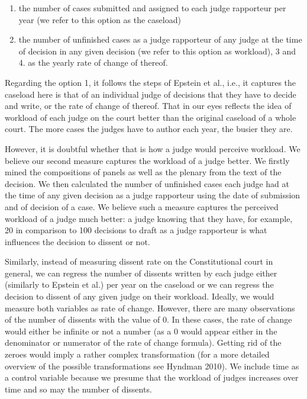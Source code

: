 \documentclass[
  11pt,
]{article}
\providecommand{\tightlist}{%
  \setlength{\itemsep}{0pt}\setlength{\parskip}{0pt}}
\begin{document}
\begin{enumerate}
\def\labelenumi{\arabic{enumi}.}
\tightlist
\item
  the number of cases submitted and assigned to each judge rapporteur
  per year (we refer to this option as the caseload)
\item
  the number of unfinished cases as a judge rapporteur of any judge at
  the time of decision in any given decision (we refer to this option as
  workload), 3 and 4. as the yearly rate of change of thereof.
\end{enumerate}

Regarding the option 1, it follows the steps of Epstein et al., i.e., it
captures the caseload here is that of an individual judge of decisions
that they have to decide and write, or the rate of change of thereof.
That in our eyes reflects the idea of workload of each judge on the
court better than the original caseload of a whole court. The more cases
the judges have to author each year, the busier they are.

However, it is doubtful whether that is how a judge would perceive
workload. We believe our second measure captures the workload of a judge
better. We firstly mined the compositions of panels as well as the
plenary from the text of the decision. We then calculated the number of
unfinished cases each judge had at the time of any given decision as a
judge rapporteur using the date of submission and of decision of a case.
We believe such a measure captures the perceived workload of a judge
much better: a judge knowing that they have, for example, 20 in
comparison to 100 decisions to draft as a judge rapporteur is what
influences the decision to dissent or not.

Similarly, instead of measuring dissent rate on the Constitutional court
in general, we can regress the number of dissents written by each judge
either (similarly to Epstein et al.) per year on the caseload or we can
regress the decision to dissent of any given judge on their workload.
Ideally, we would measure both variables as rate of change. However,
there are many observations of the number of dissents with the value of
0. In these cases, the rate of change would either be infinite or not a
number (as a 0 would appear either in the denominator or numerator of
the rate of change formula). Getting rid of the zeroes would imply a
rather complex transformation (for a more detailed overview of the
possible transformations see Hyndman 2010). We include time as a control
variable because we presume that the workload of judges increases over
time and so may the number of dissents.
\end{document}
